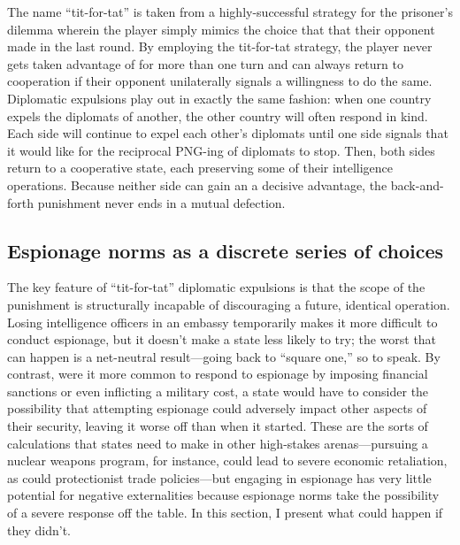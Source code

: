 \documentclass[14pt]{extarticle}
\begin{document}
The name \enquote{tit-for-tat} is taken from a highly-successful strategy for the prisoner's dilemma wherein the player simply mimics the choice that that their opponent made in the last round. By employing the tit-for-tat strategy, the player never gets taken advantage of for more than one turn and can always return to cooperation if their opponent unilaterally signals a willingness to do the same. Diplomatic expulsions play out in exactly the same fashion: when one country expels the diplomats of another, the other country will often respond in kind. Each side will continue to expel each other's diplomats until one side signals that it would like for the reciprocal PNG-ing of diplomats to stop. Then, both sides return to a cooperative state, each preserving some of their intelligence operations. Because neither side can gain an a decisive advantage, the back-and-forth punishment never ends in a mutual defection.

\subsection{Espionage norms as a discrete series of choices}
The key feature of \enquote{tit-for-tat} diplomatic expulsions is that the scope of the punishment is structurally incapable of discouraging a future, identical operation. Losing intelligence officers in an embassy temporarily makes it more difficult to conduct espionage, but it doesn't make a state less likely to try; the worst that can happen is a net-neutral result---going back to \enquote{square one,} so to speak. By contrast, were it more common to respond to espionage by imposing financial sanctions or even inflicting a military cost, a state would have to consider the possibility that attempting espionage could adversely impact other aspects of their security, leaving it worse off than when it started. These are the sorts of calculations that states need to make in other high-stakes arenas---pursuing a nuclear weapons program, for instance, could lead to severe economic retaliation, as could protectionist trade policies---but engaging in espionage has very little potential for negative externalities because espionage norms take the possibility of a severe response off the table. In this section, I present what could happen if they didn't.
\end{document}
